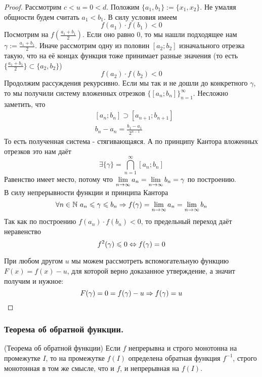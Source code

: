\begin{proof}
	Рассмотрим $c < u = 0 < d$. Положим $\{a_1, b_1\} := \{x_1, x_2\}$. Не умаляя общности будем считать $a_1 < b_1$. В силу условия имеем
	\[
		f(a_1) \cdot f(b_1) < 0
	\]
	Посмотрим на $f(\frac{a_1 + b_1}{2})$. Если оно равно 0, то мы нашли подходящее нам $\gamma := \frac{a_1 + b_1}{2}$. Иначе рассмотрим одну из половин $[a_2; b_2]$ изначального отрезка такую, что на её концах функция тоже принимает разные значения (то есть \(\{\frac{a_1 + b_1}{2}\} \subset \{a_2, b_2\}\))
	\[
		f(a_2) \cdot f(b_2) < 0
	\]
	Продолжим рассуждения рекурсивно. Если мы так и не дошли до конкретного $\gamma$, то мы получили систему вложенных отрезков $\{[a_n; b_n]\}_{n = 1}^\infty$. Несложно заметить, что
	\begin{align*}
		&{[a_n; b_n] \supset [a_{n + 1}; b_{n + 1}]}
		\\
		&{b_n - a_n = \frac{b_1 - a_1}{2^{n - 1}}}
	\end{align*}
	То есть полученная система - стягивающаяся. А по принципу Кантора вложенных отрезков это нам даёт
	\[
		\exists \{\gamma\} = \bigcap\limits_{n = 1}^\infty [a_n; b_n]
	\]
	Равенство имеет место, потому что $\lim\limits_{n \to \infty} a_n = \lim\limits_{n \to \infty} b_n = \gamma$ по построению.\\
	В силу непрерывности функции и принципа Кантора
	\[
		\forall n \in \mathbb{N}\ a_n \leqslant \gamma \leqslant b_n \Rightarrow f(\gamma) = \lim\limits_{n \to \infty} a_n = \lim\limits_{n \to \infty} b_n
	\]
	Так как по построению $f(a_n) \cdot f(b_n) < 0$, то предельный переход даёт неравенство
	\[
		f^2(\gamma) \leqslant 0 \Leftrightarrow f(\gamma) = 0
	\]
	
	При любом другом $u$ мы можем рассмотреть вспомогательную функцию $F(x) = f(x) - u$, для которой верно доказанное утверждение, а значит получим и нужное:
	\[
		F(\gamma) = 0 = f(\gamma) - u \Rightarrow f(\gamma) = u
	\]
\end{proof}

\subsubsection{Теорема об обратной функции.}

\begin{theorem} (Теорема об обратной функции)
	Если $f$ непрерывна и строго монотонна на промежутке $I$, то на промежутке $f(I)$ определена обратная функция $f^{-1}$, строго монотонная в том же смысле, что и $f$, и непрерывная на $f(I)$.
\end{theorem}

